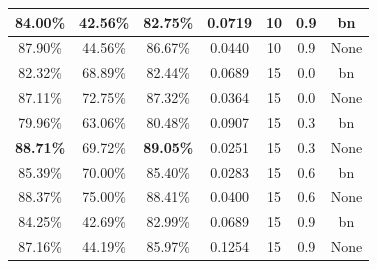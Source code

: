 \begin{table}[ht]
\begin{tabular}{|c|c|c|c|c|c|c|}
84.00\% & 42.56\% & 82.75\% & 0.0719 & 10 & 0.9 & bn\\ \hline
87.90\% & 44.56\% & 86.67\% & 0.0440 & 10 & 0.9 & None\\ \hline
82.32\% & 68.89\% & 82.44\% & 0.0689 & 15 & 0.0 & bn\\ \hline
87.11\% & 72.75\% & 87.32\% & 0.0364 & 15 & 0.0 & None\\ \hline
79.96\% & 63.06\% & 80.48\% & 0.0907 & 15 & 0.3 & bn\\ \hline
\textbf{88.71\%} & 69.72\% & \textbf{89.05\%} & 0.0251 & 15 & 0.3 & None\\ \hline
85.39\% & 70.00\% & 85.40\% & 0.0283 & 15 & 0.6 & bn\\ \hline
88.37\% & 75.00\% & 88.41\% & 0.0400 & 15 & 0.6 & None\\ \hline
84.25\% & 42.69\% & 82.99\% & 0.0689 & 15 & 0.9 & bn\\ \hline
87.16\% & 44.19\% & 85.97\% & 0.1254 & 15 & 0.9 & None\\ \hline
\end{tabular}
\end{table}